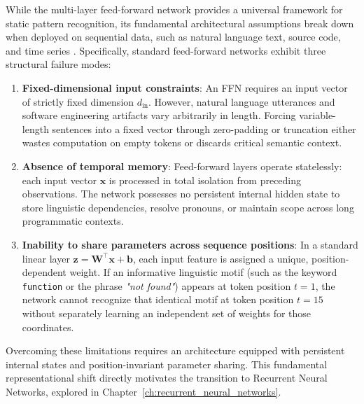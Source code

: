 \documentclass[../../../main.tex]{subfiles}
\begin{document}
While the multi-layer feed-forward network provides a universal framework for static pattern recognition, its fundamental architectural assumptions break down when deployed on sequential data, such as natural language text, source code, and time series \citep{goodfellow2016,bishop2024deep}. Specifically, standard feed-forward networks exhibit three structural failure modes:
\begin{enumerate}[label=(\roman*)]
    \item \textbf{Fixed-dimensional input constraints}: An FFN requires an input vector of strictly fixed dimension $d_{\text{in}}$. However, natural language utterances and software engineering artifacts vary arbitrarily in length. Forcing variable-length sentences into a fixed vector through zero-padding or truncation either wastes computation on empty tokens or discards critical semantic context.
    \item \textbf{Absence of temporal memory}: Feed-forward layers operate statelessly: each input vector $\mathbf{x}$ is processed in total isolation from preceding observations. The network possesses no persistent internal hidden state to store linguistic dependencies, resolve pronouns, or maintain scope across long programmatic contexts.
    \item \textbf{Inability to share parameters across sequence positions}: In a standard linear layer $\mathbf{z} = \mathbf{W}^\top \mathbf{x} + \mathbf{b}$, each input feature is assigned a unique, position-dependent weight. If an informative linguistic motif (such as the keyword \texttt{function} or the phrase \textit{"not found"}) appears at token position $t = 1$, the network cannot recognize that identical motif at token position $t = 15$ without separately learning an independent set of weights for those coordinates.
\end{enumerate}

Overcoming these limitations requires an architecture equipped with persistent internal states and position-invariant parameter sharing. This fundamental representational shift directly motivates the transition to Recurrent Neural Networks, explored in Chapter~\ref{ch:recurrent_neural_networks}.

\clearpage
\thispagestyle{empty}
\null
\clearpage
\end{document}
